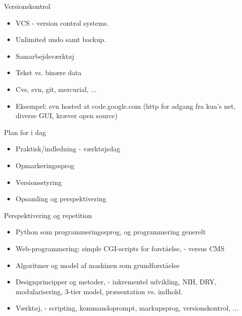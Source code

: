 \documentclass[a4paper,landscape]{slides}
\begin{document}
\begin{slide}
	\begin{center} {\large 
        Versionskontrol
	} \end{center}
	\begin{itemize} \addtolength{\itemsep}{-\baselineskip}
              \item VCS - version control systems.
              \item Unlimited undo samt backup.
              \item Samarbejdsværktøj
              \item Tekst vs. binære data
              \item Cvs, svn, git, mercurial, ...
              \item Eksempel: svn hosted at code.google.com (http for adgang fra kua's net, diverse GUI, kræver open source)
	\end{itemize}
\end{slide}

\begin{slide}
	\begin{center} {\large 
            Plan for i dag
	} \end{center}
	\begin{itemize} \addtolength{\itemsep}{-\baselineskip}
            \item Praktisk/indledning - værktøjsdag
            \item Opmarkeringssprog
            \item Versionsstyring
            \item Opsamling og perspektivering
	\end{itemize}
\end{slide}

\begin{slide}
	\begin{center} {\large 
        Perspektivering og repetition
	} \end{center}
	\begin{itemize} \addtolength{\itemsep}{-\baselineskip}
              \item Python som programmeringssprog, og programmering generelt
              \item Web-programmering: simple CGI-scripts for forståelse, - versus CMS
              \item Algoritmer og model af maskinen som grundforståelse
              \item Designprincipper og metoder, - inkrementel udvikling, NIH, DRY, modularisering, 3-tier model, præsentation vs. indhold.
              \item Værktøj, - scripting, kommandoprompt, markupsprog, versionskontrol, ... 
	\end{itemize}
\end{slide}
\end{document}
